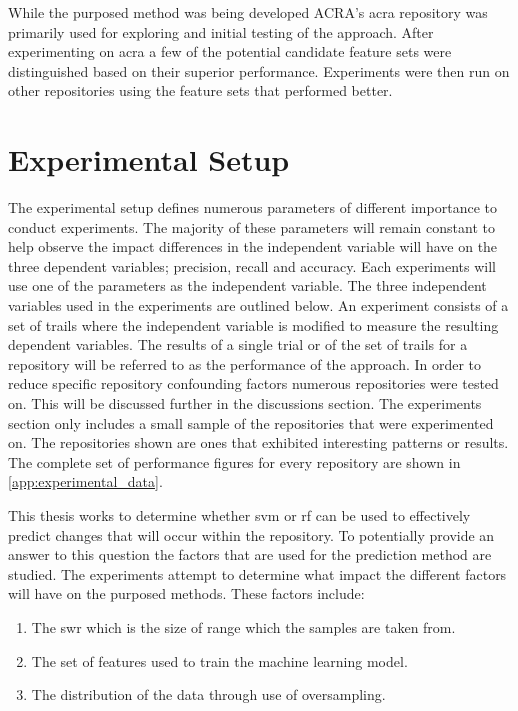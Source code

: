 While the purposed method was being developed ACRA's acra repository was primarily used for exploring and initial testing of the approach. After experimenting on acra a few of the potential candidate feature sets were distinguished based on their superior performance. Experiments were then run on other repositories using the feature sets that performed better.

\section{Experimental Setup}


The experimental setup defines numerous parameters of different importance to conduct experiments. The majority of these parameters will remain constant to help observe the impact differences in the independent variable will have on the three dependent variables; precision, recall and accuracy. Each experiments will use one of the parameters as the independent variable. The three independent variables used in the experiments are outlined below. An experiment consists of a set of trails where the independent variable is modified to measure the resulting dependent variables. The results of a single trial or of the set of trails for a repository will be referred to as the performance of the approach. In order to reduce specific repository confounding factors numerous repositories were tested on. This will be discussed further in the discussions section. The experiments section only includes a small sample of the repositories that were experimented on. The repositories shown are ones that exhibited interesting patterns or results. The complete set of performance figures for every repository are shown in \autoref{app:experimental_data}.

This thesis works to determine whether \gls{svm} or \gls{rf} can be used to effectively predict changes that will occur within the repository. To potentially provide an answer to this question the factors that are used for the prediction method are studied. The experiments attempt to determine what impact the different factors will have on the purposed methods. These factors include:
\begin{enumerate}
\item The \gls{swr} which is the size of range which the samples are taken from.
\item The set of features used to train the machine learning model.
\item The distribution of the data through use of oversampling.
\end{enumerate}

